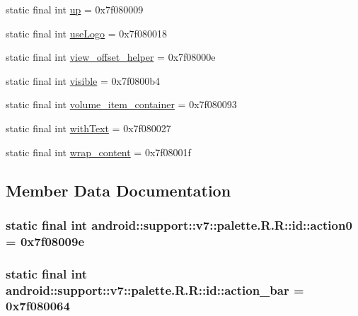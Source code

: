 \begin{CompactItemize}
\item 
static final int \hyperlink{classandroid_1_1support_1_1v7_1_1palette_1_1_r_1_1id_58123eef37d2f6423ac623072f1ca76d}{up} = 0x7f080009
\item 
static final int \hyperlink{classandroid_1_1support_1_1v7_1_1palette_1_1_r_1_1id_478eb97f6985694a0a9ca3b578d9fbc2}{useLogo} = 0x7f080018
\item 
static final int \hyperlink{classandroid_1_1support_1_1v7_1_1palette_1_1_r_1_1id_29016084f2569f69f0f829c80fd62bb7}{view\_\-offset\_\-helper} = 0x7f08000e
\item 
static final int \hyperlink{classandroid_1_1support_1_1v7_1_1palette_1_1_r_1_1id_8e8ad06ddd735a0f8ccfcdded71302aa}{visible} = 0x7f0800b4
\item 
static final int \hyperlink{classandroid_1_1support_1_1v7_1_1palette_1_1_r_1_1id_e2ff99f8d8af059dce49bfa3fe337247}{volume\_\-item\_\-container} = 0x7f080093
\item 
static final int \hyperlink{classandroid_1_1support_1_1v7_1_1palette_1_1_r_1_1id_532731934643a4e65df770cfbb40a3b9}{withText} = 0x7f080027
\item 
static final int \hyperlink{classandroid_1_1support_1_1v7_1_1palette_1_1_r_1_1id_7775e5cbef7f79c2aee7c90cc32336a8}{wrap\_\-content} = 0x7f08001f
\end{CompactItemize}


\subsection{Member Data Documentation}
\hypertarget{classandroid_1_1support_1_1v7_1_1palette_1_1_r_1_1id_5747c4fd061cae0ee559522ab9a1da4f}{
\subsubsection[{action0}]{\setlength{\rightskip}{0pt plus 5cm}static final int android::support::v7::palette.R.R::id::action0 = 0x7f08009e}}
\label{classandroid_1_1support_1_1v7_1_1palette_1_1_r_1_1id_5747c4fd061cae0ee559522ab9a1da4f}


\hypertarget{classandroid_1_1support_1_1v7_1_1palette_1_1_r_1_1id_2c66ef5f99f38e69d989475d6f5c16c6}{
\subsubsection[{action\_\-bar}]{\setlength{\rightskip}{0pt plus 5cm}static final int android::support::v7::palette.R.R::id::action\_\-bar = 0x7f080064}}
\label{classandroid_1_1support_1_1v7_1_1palette_1_1_r_1_1id_2c66ef5f99f38e69d989475d6f5c16c6}


